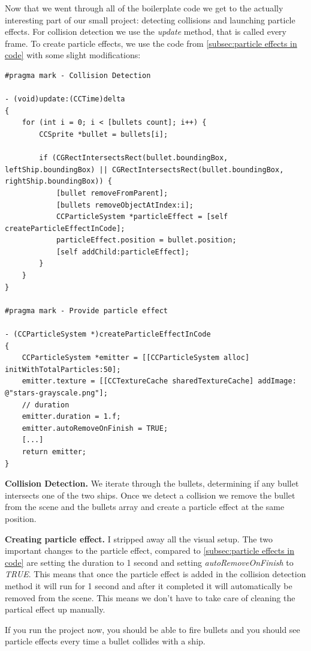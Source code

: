 \documentclass{scrreprt}
\begin{document}
Now that we went through all of the
boilerplate code we get to the actually interesting part of our small project:
detecting collisions and launching particle effects.
For collision detection we use the \textit{update} method, that is called every
frame. To create particle effects, we use the code from \ref{subsec:particle
effects in code} with some slight modifications:
\begin{lstlisting}
#pragma mark - Collision Detection

- (void)update:(CCTime)delta
{
    for (int i = 0; i < [bullets count]; i++) {
        CCSprite *bullet = bullets[i];
        
        if (CGRectIntersectsRect(bullet.boundingBox, leftShip.boundingBox) || CGRectIntersectsRect(bullet.boundingBox, rightShip.boundingBox)) {
            [bullet removeFromParent];
            [bullets removeObjectAtIndex:i];
            CCParticleSystem *particleEffect = [self createParticleEffectInCode];
            particleEffect.position = bullet.position;
            [self addChild:particleEffect];
        }
    }
}
 
#pragma mark - Provide particle effect

- (CCParticleSystem *)createParticleEffectInCode
{
    CCParticleSystem *emitter = [[CCParticleSystem alloc] initWithTotalParticles:50];
	emitter.texture = [[CCTextureCache sharedTextureCache] addImage: @"stars-grayscale.png"];
	// duration
	emitter.duration = 1.f;
    emitter.autoRemoveOnFinish = TRUE;
	[...]
	return emitter;
}
\end{lstlisting}

\textbf{Collision
Detection.} We iterate through the bullets, determining if any bullet intersects one of the two ships. Once we detect a collision we remove the
bullet from the scene and the bullets array and create a particle effect at the
same position.

\textbf{Creating particle effect.} I stripped away all the visual setup. The two
important changes to the particle effect, compared to \ref{subsec:particle
effects in code} are setting the duration to 1 second and setting
\textit{autoRemoveOnFinish} to \textit{TRUE}. This means that once the particle
effect is added in the collision detection method it will run for 1 second and
after it completed it will automatically be removed from the scene. This means
we don't have to take care of cleaning the partical effect up manually.

If you run the project now, you should be able to fire bullets and you should
see particle effects every time a bullet collides with a ship.
\end{document}
